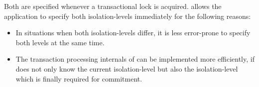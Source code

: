 \documentclass[a4paper, 10pt]{book}
\begin{document}
                                Both are specified whenever a transactional lock is acquired. \SYNEIGHT
                                allows the application to specify both isolation-levels immediately
                                for the following reasons:
                                \begin{itemize}
                                    \item In situations when both isolation-levels differ, it is less
                                        error-prone to specify both levels at the same time.
                                    \item The transaction processing internals of \SYNEIGHT can be implemented
                                        more efficiently, if \SYNEIGHT does not only know the current
                                        isolation-level but also the isolation-level which is finally
                                        required for commitment. 
                                \end{itemize}
\end{document}
